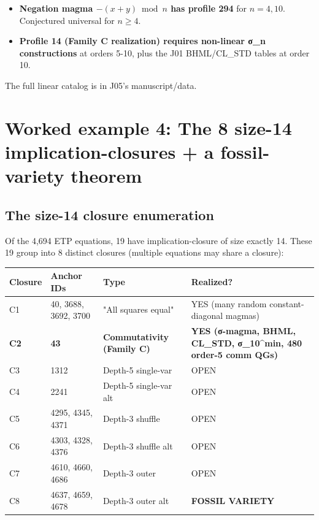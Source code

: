 \documentclass[11pt,reqno]{amsart}
\theoremstyle{plain}
\theoremstyle{definition}
\begin{document}
\begin{itemize}
\item \textbf{Negation magma $-(x + y) \bmod n$ has profile 294} for $n = 4, 10$. Conjectured universal for $n \geq 4$.
\end{itemize}

\begin{itemize}
\item \textbf{Profile 14 (Family C realization) requires non-linear σ_n constructions} at orders 5-10, plus the J01 BHML/CL_STD tables at order 10.
\end{itemize}

The full linear catalog is in J05's manuscript/data.

\section{Worked example 4: The 8 size-14 implication-closures + a fossil-variety theorem}

\subsection{The size-14 closure enumeration}

Of the 4,694 ETP equations, 19 have implication-closure of size exactly 14. These 19 group into 8 distinct closures (multiple equations may share a closure):

\begin{center}
\begin{tabular}{llll}
\toprule
Closure & Anchor IDs & Type & Realized? \\
\midrule
C1 & 40, 3688, 3692, 3700 & "All squares equal" & YES (many random constant-diagonal magmas) \\
\textbf{C2} & \textbf{43} & \textbf{Commutativity (Family C)} & \textbf{YES (σ-magma, BHML, CL_STD, σ_10^min, 480 order-5 comm QGs)} \\
C3 & 1312 & Depth-5 single-var & OPEN \\
C4 & 2241 & Depth-5 single-var alt & OPEN \\
C5 & 4295, 4345, 4371 & Depth-3 shuffle & OPEN \\
C6 & 4303, 4328, 4376 & Depth-3 shuffle alt & OPEN \\
C7 & 4610, 4660, 4686 & Depth-3 outer & OPEN \\
C8 & 4637, 4659, 4678 & Depth-3 outer alt & \textbf{FOSSIL VARIETY} \\
\bottomrule
\end{tabular}
\end{center}
\end{document}
